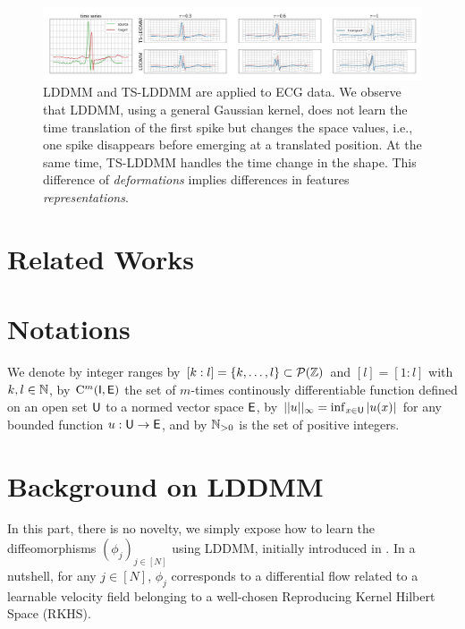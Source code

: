 \begin{figure}[t]
  \centering
  \includegraphics[width=\linewidth]{"./pictures/transport.jpeg"}
  
  \caption{LDDMM and TS-LDDMM are applied to ECG data.
  We observe that LDDMM, using a general Gaussian kernel, does not learn the time translation of the first spike but changes the space values, i.e., one spike disappears before emerging at a translated position. At the same time, TS-LDDMM handles the time change in the shape.
  This difference of \textit{deformations} implies differences in features \textit{representations}.   }
  \label{fig:transport}
  
\end{figure}

\section{Related Works}
\section{Notations}
We denote by integer ranges by $[k:l]=\{k,\ldots,l\}\subset \mathcal{P}(\mathbb{Z})$ and $ [l]=[1:l]$ with $k,l\in \mathbb{N}$,
by $\mathrm{C}^m(\mathsf{I},\mathsf{E})$ the set of $m$-times continously differentiable function defined on an open set $\mathsf{U}$ to a normed vector space $\mathsf{E}$,
 by $||u||_\infty=\inf_{x\in \mathsf{U}} |u(x)| $ for any bounded function $u:\mathsf{U} \to \mathsf{E}$,
and by $\mathbb{N}_{>0}$ is the set of positive integers. 

\section{Background on LDDMM}
\label{section:LDDMM}
In this part, there is no novelty, we simply expose how to
 learn the diffeomorphisms $(\phi_j)_{j\in[N]}$ using LDDMM, initially introduced in \cite{beg2005computing}.
  In a nutshell, for any $j\in [N]$, $\phi_j$ corresponds to a differential flow related to a learnable velocity field belonging to a well-chosen Reproducing Kernel Hilbert Space (RKHS).

